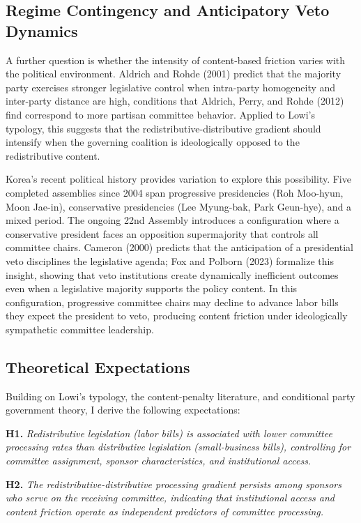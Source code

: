 \documentclass[11pt]{article}
\begin{document}
\subsection{Regime Contingency and Anticipatory Veto Dynamics}
\label{sec:regime}

A further question is whether the intensity of content-based friction varies with the political environment. Aldrich and Rohde (2001) predict that the majority party exercises stronger legislative control when intra-party homogeneity and inter-party distance are high, conditions that Aldrich, Perry, and Rohde (2012) find correspond to more partisan committee behavior. Applied to Lowi's typology, this suggests that the redistributive-distributive gradient should intensify when the governing coalition is ideologically opposed to the redistributive content.

Korea's recent political history provides variation to explore this possibility. Five completed assemblies since 2004 span progressive presidencies (Roh Moo-hyun, Moon Jae-in), conservative presidencies (Lee Myung-bak, Park Geun-hye), and a mixed period. The ongoing 22nd Assembly introduces a configuration where a conservative president faces an opposition supermajority that controls all committee chairs. Cameron (2000) predicts that the anticipation of a presidential veto disciplines the legislative agenda; Fox and Polborn (2023) formalize this insight, showing that veto institutions create dynamically inefficient outcomes even when a legislative majority supports the policy content. In this configuration, progressive committee chairs may decline to advance labor bills they expect the president to veto, producing content friction under ideologically sympathetic committee leadership.

\subsection{Theoretical Expectations}

Building on Lowi's typology, the content-penalty literature, and conditional party government theory, I derive the following expectations:

\medskip
\noindent\textbf{H1.} \textit{Redistributive legislation (labor bills) is associated with lower committee processing rates than distributive legislation (small-business bills), controlling for committee assignment, sponsor characteristics, and institutional access.}

\medskip
\noindent\textbf{H2.} \textit{The redistributive-distributive processing gradient persists among sponsors who serve on the receiving committee, indicating that institutional access and content friction operate as independent predictors of committee processing.}
\end{document}
